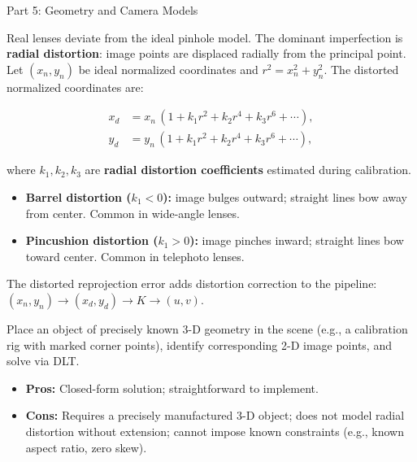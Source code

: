 \documentclass[letterpaper]{article}
\begin{document}
\begin{notes}{Part 5: Geometry and Camera Models}

Real lenses deviate from the ideal pinhole model.  The dominant
imperfection is \textbf{radial distortion}: image points are displaced
radially from the principal point.  Let $(x_n, y_n)$ be ideal normalized
coordinates and $r^2 = x_n^2 + y_n^2$.  The distorted normalized coordinates are:

\begin{align}
    x_d &= x_n\,(1 + k_1 r^2 + k_2 r^4 + k_3 r^6 + \cdots),\\
    y_d &= y_n\,(1 + k_1 r^2 + k_2 r^4 + k_3 r^6 + \cdots),
\end{align}

where $k_1, k_2, k_3$ are \textbf{radial distortion coefficients}
estimated during calibration.

\begin{itemize}[noitemsep]
  \item \textbf{Barrel distortion ($k_1 < 0$):} image bulges outward;
        straight lines bow away from center.  Common in wide-angle lenses.
  \item \textbf{Pincushion distortion ($k_1 > 0$):} image pinches inward;
        straight lines bow toward center.  Common in telephoto lenses.
\end{itemize}

The distorted reprojection error adds distortion correction to the pipeline:
$(x_n, y_n) \to (x_d, y_d) \to K \to (u, v)$.



Place an object of precisely known 3-D geometry in the scene (e.g., a
calibration rig with marked corner points), identify corresponding 2-D
image points, and solve via DLT.

\begin{itemize}[noitemsep]
  \item \textbf{Pros:} Closed-form solution; straightforward to implement.
  \item \textbf{Cons:} Requires a precisely manufactured 3-D object;
        does not model radial distortion without extension; cannot impose
        known constraints (e.g., known aspect ratio, zero skew).
\end{itemize}



\end{notes}
\end{document}
